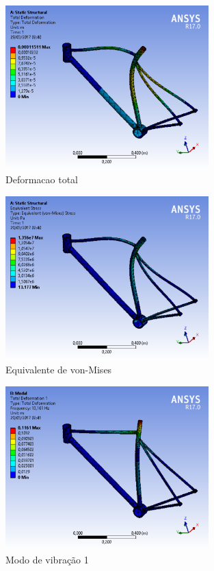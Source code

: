 		\graphicspath{{figuras/}}
			\begin{figure}[h!]
			\centering
			\includegraphics[width=0.7\textwidth]{deformacao_total.png}
			\caption{Deformacao total}
			\label{img:deformacao_total}
			\end{figure}	
			
		\graphicspath{{figuras/}}
			\begin{figure}[h!]
			\centering
			\includegraphics[width=0.7\textwidth]{equivalente_de_von_mises.png}
			\caption{Equivalente de von-Mises}
			\label{img:equivalente_de_von_mises}
			\end{figure}	
			
		\graphicspath{{figuras/}}
			\begin{figure}[h!]
			\centering
			\includegraphics[width=0.7\textwidth]{modo_de_vibracao.png}
			\caption{Modo de vibração 1}
			\label{img:modo_de_vibracao}
			\end{figure}	
			
